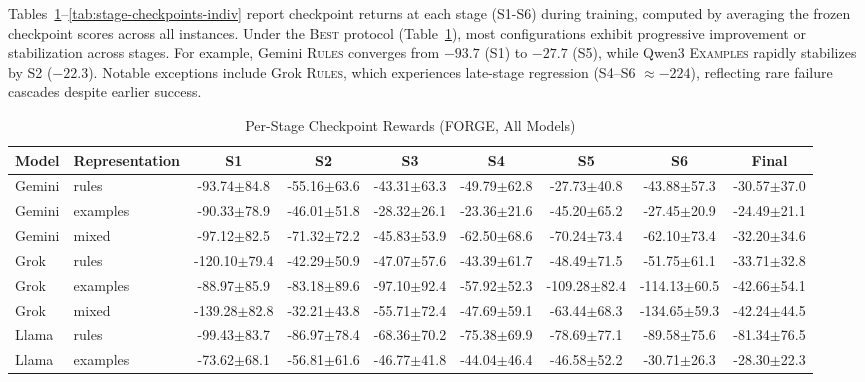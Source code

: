 \documentclass[sigconf]{acmart}
\begin{document}
Tables~\ref{tab:stage-checkpoints}--\ref{tab:stage-checkpoints-indiv} report checkpoint returns at each stage (S1-S6) during training, computed by averaging the frozen checkpoint scores across all instances. Under the \textsc{Best} protocol (Table~\ref{tab:stage-checkpoints}), most configurations exhibit progressive improvement or stabilization across stages. For example, Gemini \textsc{Rules} converges from $-93.7$ (S1) to $-27.7$ (S5), while Qwen3 \textsc{Examples} rapidly stabilizes by S2 ($-22.3$). Notable exceptions include Grok \textsc{Rules}, which experiences late-stage regression (S4--S6 $\approx -224$), reflecting rare failure cascades despite earlier success.
\begin{table}[htbp]
\centering
\caption{Per-Stage Checkpoint Rewards (FORGE, All Models)}
\label{tab:stage-checkpoints}
\scriptsize
\begin{tabular}{llccccccc}
\toprule
\textbf{Model} & \textbf{Representation} & \textbf{S1} & \textbf{S2} & \textbf{S3} & \textbf{S4} & \textbf{S5} & \textbf{S6} & \textbf{Final} \\
\midrule
Gemini & rules & -93.74$\pm$84.8 & -55.16$\pm$63.6 & -43.31$\pm$63.3 & -49.79$\pm$62.8 & -27.73$\pm$40.8 & -43.88$\pm$57.3 & -30.57$\pm$37.0 \\
Gemini & examples & -90.33$\pm$78.9 & -46.01$\pm$51.8 & -28.32$\pm$26.1 & -23.36$\pm$21.6 & -45.20$\pm$65.2 & -27.45$\pm$20.9 & -24.49$\pm$21.1 \\
Gemini & mixed & -97.12$\pm$82.5 & -71.32$\pm$72.2 & -45.83$\pm$53.9 & -62.50$\pm$68.6 & -70.24$\pm$73.4 & -62.10$\pm$73.4 & -32.20$\pm$34.6 \\
\midrule
Grok & rules & -120.10$\pm$79.4 & -42.29$\pm$50.9 & -47.07$\pm$57.6 & -43.39$\pm$61.7 & -48.49$\pm$71.5 & -51.75$\pm$61.1 & -33.71$\pm$32.8 \\
Grok & examples & -88.97$\pm$85.9 & -83.18$\pm$89.6 & -97.10$\pm$92.4 & -57.92$\pm$52.3 & -109.28$\pm$82.4 & -114.13$\pm$60.5 & -42.66$\pm$54.1 \\
Grok & mixed & -139.28$\pm$82.8 & -32.21$\pm$43.8 & -55.71$\pm$72.4 & -47.69$\pm$59.1 & -63.44$\pm$68.3 & -134.65$\pm$59.3 & -42.24$\pm$44.5 \\
\midrule
Llama & rules & -99.43$\pm$83.7 & -86.97$\pm$78.4 & -68.36$\pm$70.2 & -75.38$\pm$69.9 & -78.69$\pm$77.1 & -89.58$\pm$75.6 & -81.34$\pm$76.5 \\
Llama & examples & -73.62$\pm$68.1 & -56.81$\pm$61.6 & -46.77$\pm$41.8 & -44.04$\pm$46.4 & -46.58$\pm$52.2 & -30.71$\pm$26.3 & -28.30$\pm$22.3 \\

\end{tabular}
\end{table}
\end{document}
